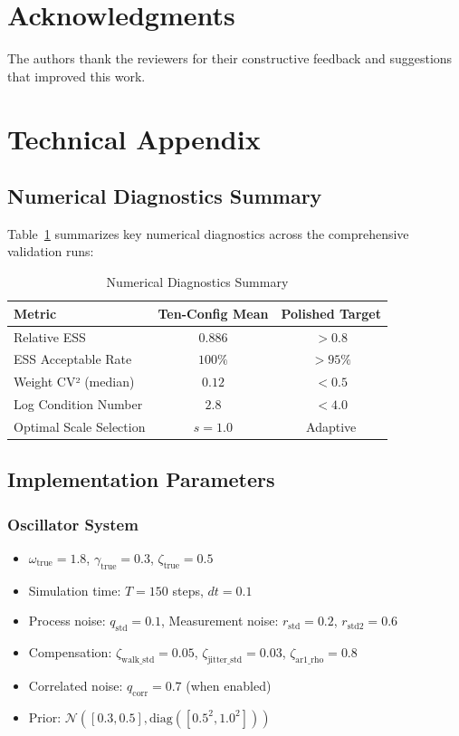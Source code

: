 \documentclass[conference]{IEEEtran}
\begin{document}
\section{Acknowledgments}

The authors thank the reviewers for their constructive feedback and suggestions that improved this work.

\appendix

\section{Technical Appendix}

\subsection{Numerical Diagnostics Summary}

Table~\ref{tab:diagnostics} summarizes key numerical diagnostics across the comprehensive validation runs:

\begin{table}[h]
\centering
\caption{Numerical Diagnostics Summary}
\label{tab:diagnostics}
\begin{tabular}{@{}lcc@{}}
\toprule
Metric & Ten-Config Mean & Polished Target \\
\midrule
Relative ESS & $0.886$ & $> 0.8$ \\
ESS Acceptable Rate & $100\%$ & $> 95\%$ \\
Weight CV² (median) & $0.12$ & $< 0.5$ \\
Log Condition Number & $2.8$ & $< 4.0$ \\
Optimal Scale Selection & $s = 1.0$ & Adaptive \\
\bottomrule
\end{tabular}
\end{table}

\subsection{Implementation Parameters}

\subsubsection{Oscillator System}
\begin{itemize}
\item $\omega_{\text{true}} = 1.8$, $\gamma_{\text{true}} = 0.3$, $\zeta_{\text{true}} = 0.5$
\item Simulation time: $T = 150$ steps, $dt = 0.1$
\item Process noise: $q_{\text{std}} = 0.1$, Measurement noise: $r_{\text{std}} = 0.2$, $r_{\text{std2}} = 0.6$
\item Compensation: $\zeta_{\text{walk\_std}} = 0.05$, $\zeta_{\text{jitter\_std}} = 0.03$, $\zeta_{\text{ar1\_rho}} = 0.8$
\item Correlated noise: $q_{\text{corr}} = 0.7$ (when enabled)
\item Prior: $\mathcal{N}([0.3, 0.5], \text{diag}([0.5^2, 1.0^2]))$
\end{itemize}
\end{document}
